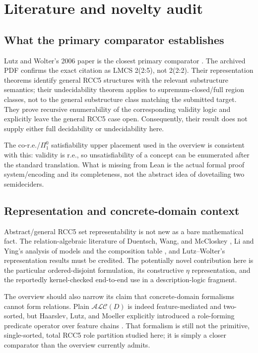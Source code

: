 \documentclass[11pt]{article}
\begin{document}
\section{Literature and novelty audit}

\subsection{What the primary comparator establishes}

Lutz and Wolter's 2006 paper is the closest primary comparator
\cite{LutzWolter2006}.  The archived PDF confirms the exact citation as
LMCS 2(2:5), not 2(2:2).  Their representation theorems identify general RCC5
structures with the relevant substructure semantics; their undecidability
theorem applies to supremum-closed/full region classes, not to the general
substructure class matching the submitted target.  They prove recursive
enumerability of the corresponding validity logic and explicitly leave the
general RCC5 case open.  Consequently, their result does not supply either
full decidability or undecidability here.

The co-r.e./\(\Pi^0_1\) satisfiability upper placement used in the overview is
consistent with this: validity is r.e., so unsatisfiability of a concept can be
enumerated after the standard translation.  What is missing from Lean is the
actual formal proof system/encoding and its completeness, not the abstract idea
of dovetailing two semideciders.

\subsection{Representation and concrete-domain context}

Abstract/general RCC5 set representability is not new as a bare mathematical
fact.  The relation-algebraic literature of Duentsch, Wang, and McCloskey
\cite{DuentschWangMcCloskey2001}, Li and Ying's analysis of models and the
composition table \cite{LiYing2003}, and Lutz--Wolter's representation results
must be credited.  The potentially novel contribution here is the particular
ordered-disjoint formulation, its constructive \(\eta\) representation, and
the reportedly kernel-checked end-to-end use in a description-logic fragment.

The overview should also narrow its claim that concrete-domain formalisms
cannot form relations.  Plain \(\mathcal{ALC}(D)\) is indeed feature-mediated
and two-sorted, but Haarslev, Lutz, and Moeller explicitly introduced a
role-forming predicate operator over feature chains
\cite{HaarslevLutzMoeller1999}.  That formalism is still not the primitive,
single-sorted, total RCC5 role partition studied here; it is simply a closer
comparator than the overview currently admits.
\end{document}
